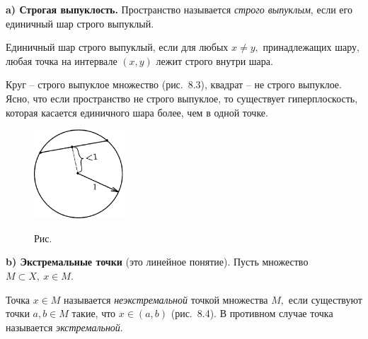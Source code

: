  {\bf \normalsize   a) Строгая выпуклость.} Пространство называется {\it строго выпуклым},
 если его единичный шар строго выпуклый.

 Единичный шар строго выпуклый, если для любых $x\ne y,$ принадлежащих шару, любая точка
 на интервале $(x,y)$
 лежит строго внутри шара.

 \begin{Example} %
 Круг -- строго выпуклое множество (рис.~8.3), квадрат -- не строго
 выпуклое. Ясно, что если пространство не строго выпуклое,
 то существует гиперплоскость, которая касается единичного
 шара более, чем в одной точке.

 \vspace{0.5cm}
 \begin{figure}[ht]
\begin{center}
\includegraphics[width=0.3\textwidth]{pict/pict08-3.eps}
\end{center}
 \bigskip
 \label{r8-3}

 \centerline{Рис.~\theris}
 \bigskip
\end{figure}
 \end{Example}

 {\bf \normalsize b) Экстремальные точки} {(это линейное понятие).}
 Пусть множество $M\subset X,~ x\in M.$

 Точка $x\in M$ называется {\it неэкстремальной} точкой множества $M,$
 если существуют точки $a,b\in M$ такие, что $x\in (a,b)$
 (рис.~8.4). В противном случае точка называется {\it экстремальной}.


